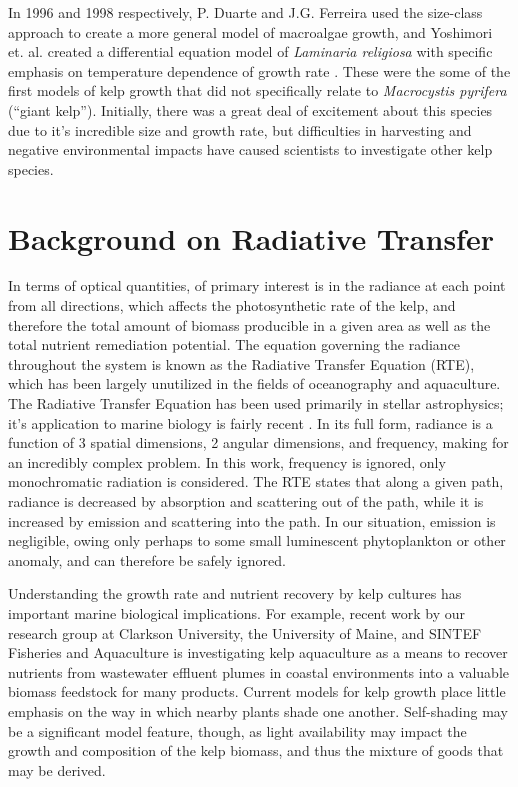 In 1996 and 1998 respectively, P. Duarte and J.G. Ferreira used the size-class approach to create a more general model of macroalgae growth, and Yoshimori et. al. created a differential equation model of \textit{Laminaria religiosa} with specific emphasis on temperature dependence of growth rate \cite{duarte_model_1997,yoshimori_mathematical_1998}.
These were the some of the first models of kelp growth that did not specifically relate to \textit{Macrocystis pyrifera} (``giant kelp''). 
Initially, there was a great deal of excitement about this species due to it's incredible size and growth rate, but difficulties in harvesting and negative environmental impacts have caused scientists to investigate other kelp species. %

\section{Background on Radiative Transfer}
In terms of optical quantities, of primary interest is in the radiance at each point from all directions, which affects the photosynthetic rate of the kelp, and therefore the total amount of biomass producible in a given area as well as the total nutrient remediation potential.
The equation governing the radiance throughout the system is known as the Radiative Transfer Equation (RTE), which has been largely unutilized in the fields of oceanography and aquaculture.
The Radiative Transfer Equation has been used primarily in stellar astrophysics; it's application to marine biology is fairly recent \cite{mobley_radiative_2001}.
In its full form, radiance is a function of 3 spatial dimensions, 2 angular dimensions, and frequency, making for an incredibly complex problem. %
In this work, frequency is ignored, only monochromatic radiation is considered.
The RTE states that along a given path, radiance is decreased by absorption and scattering out of the path, while it is increased by emission and scattering into the path.
In our situation, emission is negligible, owing only perhaps to some small luminescent phytoplankton or other anomaly, and can therefore be safely ignored.

Understanding the growth rate and nutrient recovery by
kelp cultures has important marine biological implications. For example, recent
work by our research group at Clarkson University, the University of Maine, and
SINTEF Fisheries and Aquaculture is investigating kelp aquaculture as a means to
recover nutrients from wastewater effluent plumes in coastal environments into a
valuable biomass feedstock for many products. Current models for kelp growth
place little emphasis on the way in which nearby plants shade one another.
Self-shading may be a significant model feature, though, as light availability
may impact the growth and composition of the kelp biomass, and thus the mixture
of goods that may be derived.

